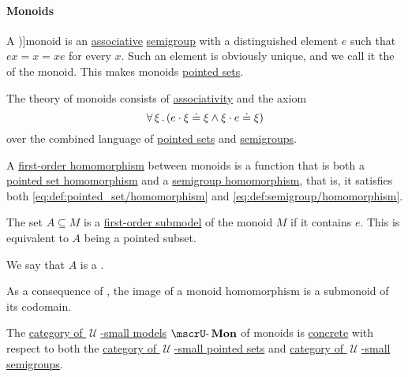 \paragraph{Monoids}

\begin{definition}\label{def:monoid}
  A \term[ru=моноид (\cite[94]{Мальцев1970})]{monoid} is an \hyperref[eq:def:binary_operation/associative]{associative} \hyperref[def:semigroup]{semigroup} with a distinguished element \( e \) such that \( ex = x = xe \) for every \( x \). Such an element is obviously unique, and we call it the  of the monoid. This makes monoids \hyperref[def:pointed_set]{pointed sets}.

  \begin{thmenum}
     The theory of monoids consists of \hyperref[eq:def:binary_operation/associative]{associativity} and the axiom
    \begin{equation}\label{eq:def:monoid/theory/neutral}
      \forall \thinspace \xi \thinspace . \thinspace (e \cdot \xi \doteq \xi \wedge \xi \cdot e \doteq \xi)
    \end{equation}
    over the combined language of \hyperref[def:pointed_set/theory]{pointed sets} and \hyperref[def:semigroup/theory]{semigroups}.

     A \hyperref[def:first_order_homomorphism]{first-order homomorphism} between monoids is a function that is both a \hyperref[def:pointed_set/homomorphism]{pointed set homomorphism} and a \hyperref[def:semigroup/homomorphism]{semigroup homomorphism}, that is, it satisfies both \eqref{eq:def:pointed_set/homomorphism} and \eqref{eq:def:semigroup/homomorphism}.

     The set \( A \subseteq M \) is a \hyperref[def:first_order_submodel]{first-order submodel} of the monoid \( M \) if it contains \( e \). This is equivalent to \( A \) being a pointed subset.

    We say that \( A \) is a .

    As a consequence of , the image of a monoid homomorphism is a submonoid of its codomain.

     The \hyperref[def:category_of_small_first_order_models]{category of \( \mscrU \)-small models} \( \ucat{Mon} \) of monoids is \hyperref[def:concrete_category]{concrete} with respect to both the \hyperref[def:pointed_set/category]{category of \( \mscrU \)-small pointed sets} and \hyperref[def:semigroup/category]{category of \( \mscrU \)-small semigroups}.


\end{thmenum}
\end{definition}
